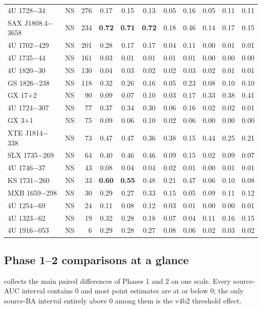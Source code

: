 {\begin{longtable}{@{}lrr*{8}{c}@{}}
4U 1728$-$34 & NS & 276 & 0.17 & 0.15 & 0.13 & 0.05 & 0.16 & 0.05 & 0.11 & 0.11 \\
SAX J1808.4$-$3658 & NS & 234 & \textbf{0.72} & \textbf{0.71} & \textbf{0.72} & 0.18 & 0.46 & 0.14 & 0.17 & 0.15 \\
4U 1702$-$429 & NS & 201 & 0.28 & 0.17 & 0.17 & 0.04 & 0.11 & 0.00 & 0.01 & 0.01 \\
4U 1735$-$44 & NS & 161 & 0.03 & 0.01 & 0.01 & 0.01 & 0.01 & 0.00 & 0.00 & 0.00 \\
4U 1820$-$30 & NS & 130 & 0.04 & 0.03 & 0.02 & 0.02 & 0.03 & 0.02 & 0.01 & 0.01 \\
GS 1826$-$238 & NS & 118 & 0.32 & 0.26 & 0.16 & 0.05 & 0.23 & 0.08 & 0.10 & 0.10 \\
GX 17+2 & NS & 90 & 0.09 & 0.07 & 0.10 & 0.03 & 0.17 & 0.33 & 0.38 & 0.41 \\
4U 1724$-$307 & NS & 77 & 0.37 & 0.34 & 0.30 & 0.06 & 0.16 & 0.02 & 0.02 & 0.01 \\
GX 3+1 & NS & 75 & 0.09 & 0.06 & 0.10 & 0.02 & 0.06 & 0.00 & 0.00 & 0.00 \\
XTE J1814$-$338 & NS & 73 & 0.47 & 0.47 & 0.36 & 0.38 & 0.15 & 0.44 & 0.25 & 0.21 \\
SLX 1735$-$269 & NS & 64 & 0.40 & 0.46 & 0.46 & 0.09 & 0.15 & 0.02 & 0.09 & 0.07 \\
4U 1746$-$37 & NS & 43 & 0.08 & 0.04 & 0.04 & 0.02 & 0.01 & 0.00 & 0.01 & 0.01 \\
KS 1731$-$260 & NS & 33 & \textbf{0.60} & \textbf{0.55} & 0.48 & 0.21 & 0.47 & 0.06 & 0.10 & 0.08 \\
MXB 1659$-$298 & NS & 30 & 0.29 & 0.27 & 0.33 & 0.15 & 0.05 & 0.09 & 0.11 & 0.12 \\
4U 1254$-$69 & NS & 24 & 0.11 & 0.08 & 0.12 & 0.03 & 0.01 & 0.00 & 0.00 & 0.01 \\
4U 1323$-$62 & NS & 19 & 0.32 & 0.28 & 0.18 & 0.07 & 0.04 & 0.11 & 0.16 & 0.15 \\
4U 1916$-$053 & NS & 6 & 0.29 & 0.28 & 0.27 & 0.08 & 0.06 & 0.02 & 0.03 & 0.02 \\
\end{longtable}}

\subsection{Phase 1--2 comparisons at a glance}
 collects the main paired differences of Phases 1 and 2 on one scale. Every source-AUC interval
contains 0 and most point estimates are at or below 0; the only source-BA interval entirely above 0 among them is the
v4b2 threshold effect.

